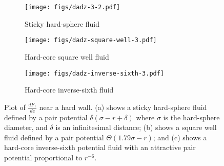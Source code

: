 \documentclass[letterpaper,twocolumn,amsmath,amssymb,pre,aps,10pt]{revtex4-1}
\newcommand{\red}[1]{{\bf \color{red} #1}}
\newcommand{\rr}{\textbf{r}}
\newcommand{\fixme}[1]{\red{[#1]}}
\begin{document}

\begin{figure}
  \begin{subfigure}{1.0\columnwidth}
    \texttt{[image: figs/dadz-3-2.pdf]}
    \vspace{-0.8cm}
    \caption{Sticky hard-sphere fluid}\label{fig:dadz-delta}
  \end{subfigure}
  \begin{subfigure}{1.0\columnwidth}
    \texttt{[image: figs/dadz-square-well-3.pdf]}
    \vspace{-0.8cm}
    \caption{Hard-core square well fluid}\label{fig:dadz-square-well}
  \end{subfigure}
  \begin{subfigure}{1.0\columnwidth}
    \texttt{[image: figs/dadz-inverse-sixth-3.pdf]}
    \vspace{-0.8cm}
    \caption{Hard-core inverse-sixth fluid}\label{fig:dadz-inverse-sixth}
  \end{subfigure}
  \caption{Plot of $\frac{dF_1}{dz}$ near a hard wall.  (a) shows a
    sticky hard-sphere fluid defined by a pair potential
    $\delta(\sigma-r+\delta)$ where $\sigma$ is the hard-sphere
    diameter, and $\delta$ is an infinitesimal distance; (b) shows a
    square well fluid defined by a pair potential $\Theta(1.79
    \sigma-r)$; and (c) shows a hard-core inverse-sixth potential
    fluid with an attractive pair potential proportional to $r^{-6}$.
  }
  \label{fig:dadz}
\end{figure}
\end{document}

